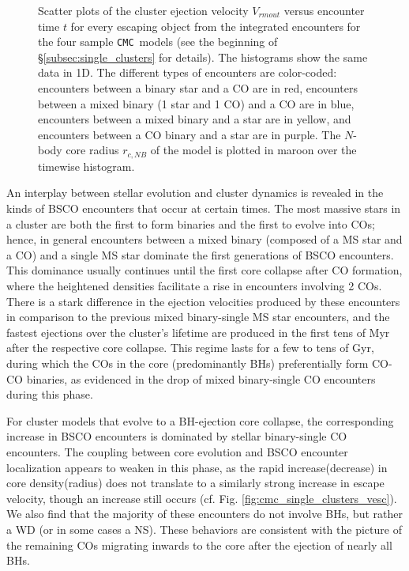 \documentclass[twocolumn]{aastex631}
\newcommand{\CMC}{\texttt{CMC}}
\begin{document}
\begin{figure*}
    \caption{
        Scatter plots of the cluster ejection velocity $V_{rm out}$ versus encounter time $t$ for every escaping object from the integrated encounters for the four sample \CMC\ models (see the beginning of \S\ref{subsec:single_clusters} for details).
        The histograms show the same data in 1D.
        The different types of encounters are color-coded: encounters between a binary star and a CO are in red,
        encounters between a mixed binary (1 star and 1 CO) and a CO are in blue, encounters between a mixed binary and a star are in yellow, and encounters between a CO binary and a star are in purple.
        The $N$-body core radius $r_{c, NB}$ \citep{1985ApJ...298...80C} of the model is plotted in maroon over the timewise histogram.
    }
    \label{fig:cmc_single_clusters}
\end{figure*}

An interplay between stellar evolution and cluster dynamics is revealed in the kinds of BSCO encounters that occur at certain times.
The most massive stars in a cluster are both the first to form binaries and the first to evolve into COs; hence, in general encounters between a mixed binary (composed of a MS star and a CO) and a single MS star dominate the first generations of BSCO encounters.
This dominance usually continues until the first core collapse after CO formation, where the heightened densities facilitate a rise in encounters involving 2 COs.
There is a stark difference in the ejection velocities produced by these encounters in comparison to the previous mixed binary-single MS star encounters, and the fastest ejections over the cluster's lifetime are produced in the first tens of Myr after the respective core collapse.
This regime lasts for a few to tens of Gyr, during which the COs in the core (predominantly BHs) preferentially form CO-CO binaries, as evidenced in the drop of mixed binary-single CO encounters during this phase.

For cluster models that evolve to a BH-ejection core collapse, the corresponding increase in BSCO encounters is dominated by stellar binary-single CO encounters.
The coupling between core evolution and BSCO encounter localization appears to weaken in this phase, as the rapid increase(decrease) in core density(radius) does not translate to a similarly strong increase in escape velocity, though an increase still occurs (cf. Fig. \ref{fig:cmc_single_clusters_vesc}).
We also find that the majority of these encounters do not involve BHs, but rather a WD (or in some cases a NS).
These behaviors are consistent with the picture of the remaining COs migrating inwards to the core after the ejection of nearly all BHs.
\end{document}
